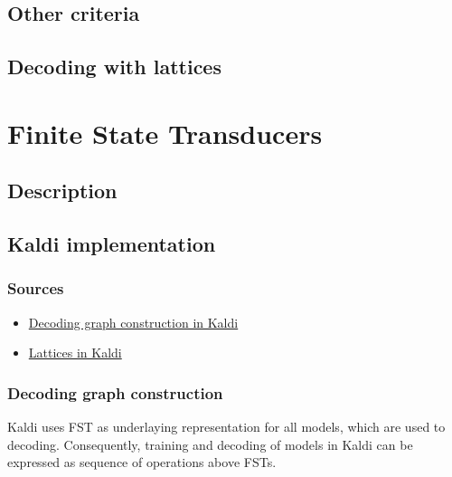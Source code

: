 \subsection{Other criteria}
\label{sub:other_criteria}


\subsection{Decoding with lattices}
\label{sub:lattice}





\section{Finite State Transducers} 
\label{sec:fst}

\subsection{Description}
\label{sub:description}


\subsection{Kaldi implementation} %
\label{sec:kaldi}


\subsubsection*{Sources} %

\begin{itemize}
    \item \href{http://kaldi.sourceforge.net/graph.html} {Decoding graph construction in Kaldi}
    \item \href{http://kaldi.sourceforge.net/lattices.html} {Lattices in Kaldi}
\end{itemize}

\subsubsection*{Decoding graph construction} %
Kaldi uses \ac{FST} as underlaying representation for all models, which are used to decoding. Consequently, training and decoding of models in Kaldi can be expressed as sequence of operations above \acp{FST}.

